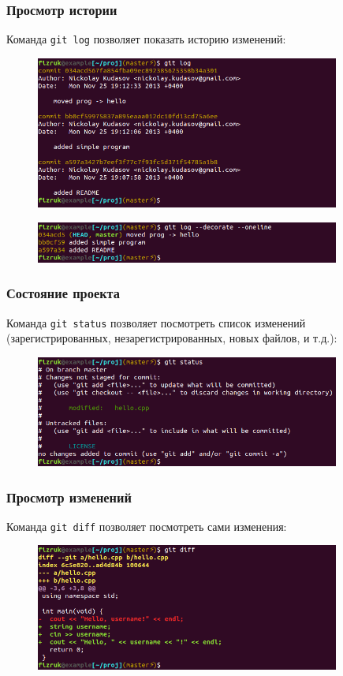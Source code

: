 \documentclass{beamer}
\begin{document}
\begin{frame}
  \frametitle{Просмотр истории}
  Команда \texttt{git log} позволяет показать историю изменений:

  \begin{figure}
     \includegraphics[width=10cm]{images/git-log.png}
  \end{figure}

  \begin{figure}
     \includegraphics[width=10cm]{images/git-log-oneline-decorate.png}
  \end{figure}
\end{frame}

\begin{frame}
  \frametitle{Состояние проекта}
  Команда \texttt{git status} позволяет посмотреть список изменений
  (зарегистрированных, незарегистрированных, новых файлов, и т.д.):

  \begin{figure}
    \includegraphics[width=10cm]{images/git-status.png}
  \end{figure}
\end{frame}

\begin{frame}
  \frametitle{Просмотр изменений}
  Команда \texttt{git diff} позволяет посмотреть сами изменения:

  \begin{figure}
    \includegraphics[width=10cm]{images/git-diff.png}
  \end{figure}
\end{frame}
\end{document}
